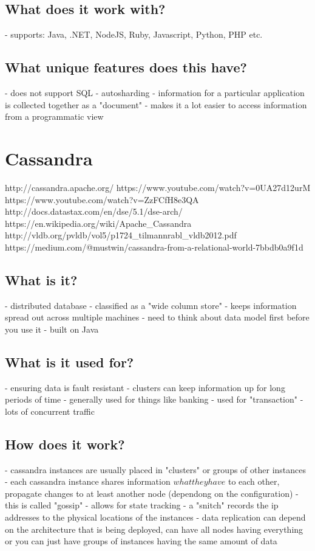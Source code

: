 \section{What does it work with?}
- supports: Java, .NET, NodeJS, Ruby, Javascript, Python, PHP etc.

\section{What unique features does this have?}
- does not support SQL
- autosharding
- information for a particular application is collected together as a "document" - makes it a lot easier to access information from a programmatic view

\chapter{Cassandra}
http://cassandra.apache.org/
https://www.youtube.com/watch?v=0UA27d12urM
https://www.youtube.com/watch?v=ZzFCfH8e3QA
http://docs.datastax.com/en/dse/5.1/dse-arch/
https://en.wikipedia.org/wiki/Apache_Cassandra
http://vldb.org/pvldb/vol5/p1724_tilmannrabl_vldb2012.pdf
https://medium.com/@mustwin/cassandra-from-a-relational-world-7bbdb0a9f1d

\section{What is it?}
- distributed database - classified as a "wide column store"
- keeps information spread out across multiple machines
- need to think about data model first before you use it
- built on Java

\section{What is it used for?}
- ensuring data is fault resistant
- clusters can keep information up for long periods of time
- generally used for things like banking
- used for "transaction" - lots of concurrent traffic

\section{How does it work?}
- cassandra instances are usually placed in "clusters" or groups of other instances
- each cassandra instance shares information \(what they have\) to each other, propagate changes to at least another node (dependong on the configuration) - this is called "gossip" - allows for state tracking
- a "snitch" records the ip addresses to the physical locations of the instances
- data replication can depend on the architecture that is being deployed, can have all nodes having everything or you can just have groups of instances having the same amount of data


